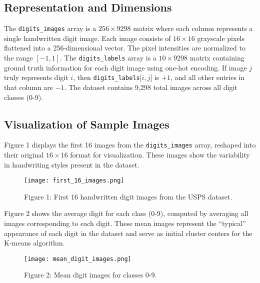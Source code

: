 \documentclass{article}
\begin{document}
\subsection{Representation and Dimensions}
The \texttt{digits\_images} array is a $256 \times 9298$ matrix where each column represents a single handwritten digit image. Each image consists of $16 \times 16$ grayscale pixels flattened into a 256-dimensional vector. The pixel intensities are normalized to the range $[-1, 1]$.
The \texttt{digits\_labels} array is a $10 \times 9298$ matrix containing ground truth information for each digit image using one-hot encoding. If image $j$ truly represents digit $i$, then \texttt{digits\_labels}[$i, j$] is $+1$, and all other entries in that column are $-1$.
The dataset contains 9,298 total images across all digit classes (0-9).
\subsection{Visualization of Sample Images}
Figure 1 displays the first 16 images from the \texttt{digits\_images} array, reshaped into their original $16 \times 16$ format for visualization. These images show the variability in handwriting styles present in the dataset.
\begin{figure}[H]
  \centering
  \texttt{[image: first\_16\_images.png]}
  \caption*{Figure 1: First 16 handwritten digit images from the USPS dataset.}
\end{figure}
Figure 2 shows the average digit for each class (0-9), computed by averaging all images corresponding to each digit. These mean images represent the ``typical'' appearance of each digit in the dataset and serve as initial cluster centers for the K-means algorithm.
\begin{figure}[H]
  \centering
  \texttt{[image: mean\_digit\_images.png]}
  \caption*{Figure 2: Mean digit images for classes 0-9.}
\end{figure}
\end{document}
